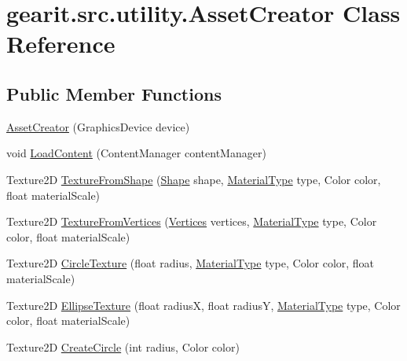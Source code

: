\hypertarget{classgearit_1_1src_1_1utility_1_1_asset_creator}{\section{gearit.\+src.\+utility.\+Asset\+Creator Class Reference}
\label{classgearit_1_1src_1_1utility_1_1_asset_creator}
}
\subsection*{Public Member Functions}
\begin{DoxyCompactItemize}
\item 
\hyperlink{classgearit_1_1src_1_1utility_1_1_asset_creator_a3c2b551ba1ad5989df3ff048c120f668}{Asset\+Creator} (Graphics\+Device device)
\item 
void \hyperlink{classgearit_1_1src_1_1utility_1_1_asset_creator_aa3a991cc76cef4e38b026e403122010c}{Load\+Content} (Content\+Manager content\+Manager)
\item 
Texture2\+D \hyperlink{classgearit_1_1src_1_1utility_1_1_asset_creator_a4fea65c4934a050c690ca9e30d92918a}{Texture\+From\+Shape} (\hyperlink{class_farseer_physics_1_1_collision_1_1_shapes_1_1_shape}{Shape} shape, \hyperlink{namespacegearit_1_1src_1_1utility_a1a6b5ed88f62fe3a535053fa2d4fa491}{Material\+Type} type, Color color, float material\+Scale)
\item 
Texture2\+D \hyperlink{classgearit_1_1src_1_1utility_1_1_asset_creator_a8bcd58d047626c164fc993cfe85150aa}{Texture\+From\+Vertices} (\hyperlink{class_farseer_physics_1_1_common_1_1_vertices}{Vertices} vertices, \hyperlink{namespacegearit_1_1src_1_1utility_a1a6b5ed88f62fe3a535053fa2d4fa491}{Material\+Type} type, Color color, float material\+Scale)
\item 
Texture2\+D \hyperlink{classgearit_1_1src_1_1utility_1_1_asset_creator_aa2af44d4fda9b1b3f8af9826a044870f}{Circle\+Texture} (float radius, \hyperlink{namespacegearit_1_1src_1_1utility_a1a6b5ed88f62fe3a535053fa2d4fa491}{Material\+Type} type, Color color, float material\+Scale)
\item 
Texture2\+D \hyperlink{classgearit_1_1src_1_1utility_1_1_asset_creator_a7e03441c07dd3f60d6818037cb516ef4}{Ellipse\+Texture} (float radius\+X, float radius\+Y, \hyperlink{namespacegearit_1_1src_1_1utility_a1a6b5ed88f62fe3a535053fa2d4fa491}{Material\+Type} type, Color color, float material\+Scale)
\item 
Texture2\+D \hyperlink{classgearit_1_1src_1_1utility_1_1_asset_creator_ad0ce058d548a06edaacb289eba7d98b3}{Create\+Circle} (int radius, Color color)
\end{DoxyCompactItemize}
